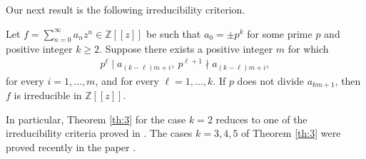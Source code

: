 \documentclass[12pt,reqno]{amsart}%
\begin{document}
Our next result is the following irreducibility criterion.
\begin{theorem}\label{th:3}
Let $f=\sum_{n=0}^\infty a_nz^n \in \mathbb{Z}[[z]]$ be such that $a_0=\pm p^k$ for some prime $p$ and positive integer $k\geq 2$. Suppose there exists a positive integer $m$ for which
\begin{eqnarray*}
p^\ell\mid a_{(k-\ell) m+i},~p^{\ell+1}\nmid a_{(k-\ell) m+i},
\end{eqnarray*}
for every $i=1, \hdots, m$, and for every $\ell=1,\hdots,k$. If $p$ does not divide $a_{km+1}$, %
then $f$ is irreducible in $\mathbb{Z}[[z]]$.
\end{theorem}
In particular, Theorem  \ref{th:3} for the case $k=2$ reduces to one of the irreducibility criteria proved in \cite{Daniel2008}. The cases $k=3,4,5$ of Theorem \ref{th:3} were proved recently in the paper \cite{Dutta2024}.
\end{document}
